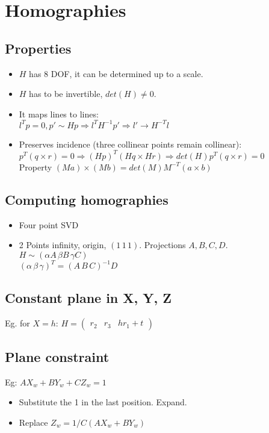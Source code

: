 \section{Homographies}
\subsection*{Properties}
\begin{itemize}
  \item $H$ has 8 DOF, it can be determined up to a scale.
  \item $H$ has to be invertible, $det(H) \neq 0$.
  \item It maps lines to lines:\\
    $l^T p = 0, p' \sim H p \Rightarrow l^T H^{-1} p' \Rightarrow l'
    \rightarrow H^{-T} l$
  \item Preserves incidence (three collinear points remain collinear):\\
    $p^T(q\times r) = 0 \Rightarrow (H p)^T (H q \times H r) \Rightarrow
    det(H) p^T (q \times r) = 0$\\
    Property $(M a) \times (M b) = det(M) M^{-T} (a \times b)$
\end{itemize}

\subsection{Computing homographies}
\begin{itemize}
  \item Four point SVD
  \item 2 Points infinity, origin, $(1\,1\,1)$. Projections $A, B, C, D$.\\
    $H \sim (\alpha A \, \beta B \, \gamma C)$\\
    $(\alpha \, \beta \, \gamma)^T = (A \, B \, C)^{-1} D$
\end{itemize}

\subsection*{Constant plane in X, Y, Z}
Eg. for $X = h$:  $H = \begin{pmatrix}
  r_2 & r_3 & h r_1 + t
\end{pmatrix}$

\subsection*{Plane constraint}
Eg: $A X_w + B Y_w + C Z_w = 1$
\begin{itemize}
  \item Substitute the 1 in the last position. Expand.
  \item Replace $Z_w = 1/C (A X_w + B Y_w)$
\end{itemize}

